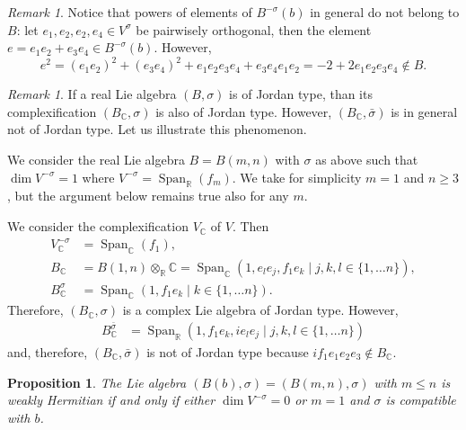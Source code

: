 \documentclass[a4paper,oneside,11pt]{amsart}
\DeclareMathOperator{\Span}{Span}
\newcommand{\R}{\mathbb R}
\newcommand{\CC}{\mathbb C}
\theoremstyle{plain}
\newtheorem{prop}[teo]{Proposition}
\theoremstyle{definition}
\theoremstyle{remark}
\newtheorem{rem}[teo]{Remark}
\begin{document}
\begin{rem}
    Notice that powers of elements of $B^{-\sigma}(b)$ in general do not belong to $B$: let $e_1,e_2,e_2,e_4\in V^\sigma$ be pairwisely orthogonal, then the element $e=e_1e_2+e_3e_4\in B^{-\sigma}(b)$. However, 
    $$e^2=(e_1e_2)^2+(e_3e_4)^2+e_1e_2e_3e_4+e_3e_4e_1e_2=-2+2e_1e_2e_3e_4\notin B.$$    
\end{rem}

\begin{rem}\label{rem:nonHerm.complexification} If a real Lie algebra $(B,\sigma)$ is of Jordan type, than its complexification $(B_\mathbb C,\sigma)$ is also of Jordan type. However, $(B_\mathbb C,\bar\sigma)$ is in general not of Jordan type. Let us illustrate this phenomenon.

We consider the real Lie algebra $B=B(m,n)$ with $\sigma$ as above such that $\dim V^{-\sigma}=1$ where $V^{-\sigma}=\Span_\R(f_m)$. We take for simplicity $m=1$ and $n\geq 3$, but the argument below remains true also for any $m$.

We consider the complexification $V_\mathbb C$ of $V$. Then
\begin{align*}
    V^{-\sigma}_\mathbb C& =\Span_\mathbb C(f_1),\\
    B_\CC& =B(1,n)\otimes_\R\CC=\Span_\CC(1,e_le_j,f_1e_k\mid j,k,l\in\{1,\dots n\}),\\
    B_\CC^{\sigma}& =\Span_\CC(1,f_1e_k\mid k\in\{1,\dots n\}).
\end{align*}
Therefore, $(B_\mathbb C,\sigma)$ is a complex Lie algebra of Jordan type. However,
\begin{align*}
    B_\CC^{\bar\sigma}&=\Span_\R(1,f_1e_k,ie_le_j\mid j,k,l\in\{1,\dots n\})
\end{align*}
and, therefore, $(B_\CC,\bar\sigma)$ is not of Jordan type because $if_1e_1e_2e_3\notin B_\mathbb C$.
\end{rem}
 
\begin{prop}\label{prop:Cliff.weaklyHerm}
    The Lie algebra $(B(b),\sigma)=(B(m,n),\sigma)$ with $m\leq n$ is weakly Hermitian if and only if either $\dim V^{-\sigma}=0$ or $m=1$ and $\sigma$ is compatible with $b$.
\end{prop}
\end{document}
